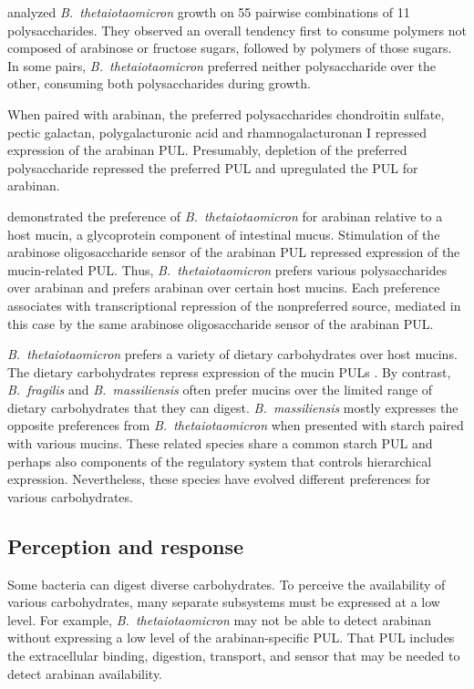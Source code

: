 \documentclass[\mydocfontsize]{article}
\begin{document}
\begin{multicols}{2}
\textcite{schwalm17prioritization} analyzed \textit{B.\ thetaiotaomicron} growth on 55 pairwise combinations of 11 polysaccharides. They observed an overall tendency first to consume polymers not composed of arabinose or fructose sugars, followed by polymers of those sugars. In some pairs, \textit{B.\ thetaiotaomicron} preferred neither polysaccharide over the other, consuming both polysaccharides during growth. 

When paired with arabinan, the preferred polysaccharides chondroitin sulfate, pectic galactan, polygalacturonic acid and rhamnogalacturonan I repressed expression of the arabinan PUL. Presumably, depletion of the preferred polysaccharide repressed the preferred PUL and upregulated the PUL for arabinan. 

\textcite{lynch12prioritization} demonstrated the preference of \textit{B.\ thetaiotaomicron} for arabinan relative to a host mucin, a glycoprotein component of intestinal mucus. Stimulation of the arabinose oligosaccharide sensor of the arabinan PUL repressed expression of the mucin-related PUL. Thus, \textit{B.\ thetaiotaomicron} prefers various polysaccharides over arabinan and prefers arabinan over certain host mucins. Each preference associates with transcriptional repression of the nonpreferred source, mediated in this case by the same arabinose oligosaccharide sensor of the arabinan PUL.

\textit{B.\ thetaiotaomicron} prefers a variety of dietary carbohydrates over host mucins. The dietary carbohydrates repress expression of the mucin PULs \autocite{rogers13dynamic,pudlo15symbiotic}. By contrast, \textit{B.\ fragilis} and \textit{B.\ massiliensis} often prefer mucins over the limited range of dietary carbohydrates that they can digest. \textit{B.\ massiliensis} mostly expresses the opposite preferences from \textit{B.\ thetaiotaomicron} when presented with starch paired with various mucins. These related species share a common starch PUL and perhaps also components of the regulatory system that controls hierarchical expression. Nevertheless, these species have evolved different preferences for various carbohydrates.

\subsection{Perception and response}

Some bacteria can digest diverse carbohydrates. To perceive the availability of various carbohydrates, many separate subsystems must be expressed at a low level. For example, \textit{B.\ thetaiotaomicron} may not be able to detect arabinan without expressing a low level of the arabinan-specific PUL. That PUL includes the extracellular binding, digestion, transport, and sensor that may be needed to detect arabinan availability.


\end{multicols}
\end{document}
